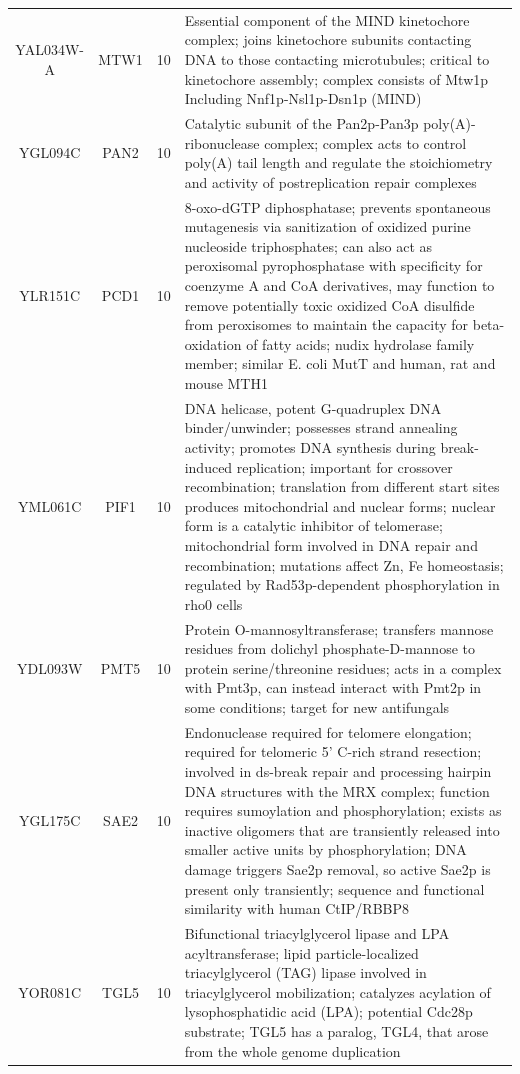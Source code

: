\documentclass[]{article}
\begin{document}
\begin{longtable}{@{\extracolsep{3pt}} cccp{85mm}}
YAL034W-A & MTW1 & 10 & Essential component of the MIND kinetochore complex; joins kinetochore subunits contacting DNA to those contacting microtubules; critical to kinetochore assembly; complex consists of Mtw1p Including Nnf1p-Nsl1p-Dsn1p (MIND) \\ 
YGL094C & PAN2 & 10 & Catalytic subunit of the Pan2p-Pan3p poly(A)-ribonuclease complex; complex acts to control poly(A) tail length and regulate the stoichiometry and activity of postreplication repair complexes \\ 
YLR151C & PCD1 & 10 & 8-oxo-dGTP diphosphatase; prevents spontaneous mutagenesis via sanitization of oxidized purine nucleoside triphosphates; can also act as peroxisomal pyrophosphatase with specificity for coenzyme A and CoA derivatives, may function to remove potentially toxic oxidized CoA disulfide from peroxisomes to maintain the capacity for beta-oxidation of fatty acids; nudix hydrolase family member; similar E. coli MutT and human, rat and mouse MTH1 \\ 
YML061C & PIF1 & 10 & DNA helicase, potent G-quadruplex DNA binder/unwinder; possesses strand annealing activity; promotes DNA synthesis during break-induced replication; important for crossover recombination; translation from different start sites produces mitochondrial and nuclear forms; nuclear form is a catalytic inhibitor of telomerase; mitochondrial form involved in DNA repair and recombination; mutations affect Zn, Fe homeostasis; regulated by Rad53p-dependent phosphorylation in rho0 cells \\ 
YDL093W & PMT5 & 10 & Protein O-mannosyltransferase; transfers mannose residues from dolichyl phosphate-D-mannose to protein serine/threonine residues; acts in a complex with Pmt3p, can instead interact with Pmt2p in some conditions; target for new antifungals \\ 
YGL175C & SAE2 & 10 & Endonuclease required for telomere elongation; required for telomeric 5' C-rich strand resection; involved in ds-break repair and processing hairpin DNA structures with the MRX complex; function requires sumoylation and phosphorylation; exists as inactive oligomers that are transiently released into smaller active units by phosphorylation; DNA damage triggers Sae2p removal, so active Sae2p is present only transiently; sequence and functional similarity with human CtIP/RBBP8 \\ 
YOR081C & TGL5 & 10 & Bifunctional triacylglycerol lipase and LPA acyltransferase; lipid particle-localized triacylglycerol (TAG) lipase involved in triacylglycerol mobilization; catalyzes acylation of lysophosphatidic acid (LPA); potential Cdc28p substrate; TGL5 has a paralog, TGL4, that arose from the whole genome duplication \\ 

\end{longtable}
\end{document}
